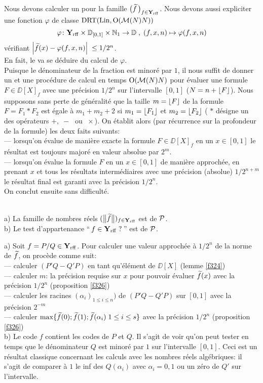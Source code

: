 \proof Nous devons calculer un \mcu pour la famille $\big(\widetilde{f}\,\big)_{f \in {{\bf Y}_{\rm rff}}}$.  Nous devons aussi expliciter une fonction $\varphi$ de classe  ${\rm DRT}({\rm Lin},{\rm O}({{\cal M}}(N) N))$
\[
\varphi \colon  {{\bf Y}_{\rm rff}}  \times \mathbb {D}_{[0,1]} \times \mathbb {N}_1 \rightarrow \mathbb {D} \; ,\;
(f,x,n) \mapsto \varphi(f,x,n)
\]
vérifiant   $\left|{\widetilde{f}(x) - \varphi(f,x,n)}\right|\;  \leq 1/2^n$.\\
En fait, le \mcu va se déduire du calcul de  $\varphi $.\\ 
Puisque le dénominateur de la fraction est minoré par  $1$, il nous suffit 
de donner un \mcu et une procédure de calcul en temps  ${\rm O}({{\cal M}}(N) N)$ pour 
évaluer une formule  $F \in \DD[X]_f$  avec une précision  $1/2^n$  sur 
l'intervalle $[0,1]$   ($N = n+ \lfloor F \rfloor$).  Nous supposons sans perte de 
généralité que la taille  $m = \lfloor F \rfloor$  de la formule  $F = F_1 * 
F_2$  est égale à $ m_1+m_2+2$  si  $m_1 = \lfloor F_1 \rfloor$  et  $m_2 = 
\lfloor F_2 \rfloor$   ( $*$  désigne un des opérateurs $+, \; - \;$ ou $\;\times$).  
On établit alors (par récurrence sur la profondeur de la formule) les deux 
faits suivants:\\ 
--- lorsqu'on évalue de manière exacte la formule  $F \in \DD[X]_f$  en un  
$x \in [0,1]$    le résultat est toujours majoré en valeur absolue par  
$2^m$. \\
--- lorsqu'on évalue la formule $F$ en un  $x \in [0,1]$    de manière 
approchée, en prenant $x$ et  tous les résultats intermédiaires avec une 
précision (absolue)  $1/2^{n+m}$  le résultat final est garanti avec la 
précision  $1/2^n$. \\
On conclut ensuite sans difficulté.
 \eop
 
\begin{fproposition} \label{f327}~\\
a) La famille de nombres réels  
$(\big\lVert  \widetilde{f} \big\rVert)_{f \in {{\bf Y}_{\rm rff}} }$  est de \com  ${\cal P}$.\\
b) Le test d'appartenance  ``$\,f \in{{\bf Y}_{\rm rff}}\; ?\,$''  est de \com  ${\cal P}$.
\end{fproposition}
\proof 
a) Soit  $f = P/Q \in {{\bf Y}_{\rm rff}} $.  Pour calculer une valeur approchée à  $1/2^n$  
de la norme de  $\widetilde{f}$, on procède comme suit:\\
--- calculer  $(P'Q - Q'P)$  en tant qu'élément de  $\DD[X]$  (lemme 
\ref{f324})\\
--- calculer  $m$: la précision requise sur $x$ pour pouvoir évaluer  
$\widetilde{f} (x)$   avec la précision  $1/2^n$  (proposition \ref{f326})\\
--- calculer les racines   $(\alpha_i)_{1 \leq i \leq n})$  de  $(P'Q - Q'P)$   
sur  $[0,1]$    avec la précision  $2^{-m}$ \\
--- calculer  $\max  \{\widetilde{f}(0);\widetilde{f}(1);\widetilde{f}(\alpha_i)
 \; 1 \leq i \leq s \}$ avec la précision  $1/2^n$ (proposition \ref{f326})\\
b) Le code $f$ contient les codes de $P$ et $Q$. Il s'agit de voir qu'on peut tester en temps \poll que le dénominateur $Q$ est minoré par $1$ sur 
l'intervalle $[0,1]$. 
Ceci est un résultat classique concernant les calculs avec les nombres réels algébriques: il s'agit de comparer à $1$ le inf des $Q(\alpha_i)$ avec $\alpha_i=0,1$ ou un zéro de $Q'$ sur l'intervalle. 
\eop

